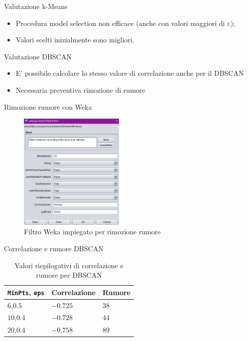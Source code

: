 \documentclass{beamer}
\begin{document}
\begin{frame}{Valutazione k-Means} 
    \begin{itemize}
      \item Procedura model selection non efficace (anche con valori maggiori di $\varepsilon$);
      \item Valori scelti inizialmente sono migliori.
    \end{itemize} 
\end{frame}

\begin{frame}{Valutazione DBSCAN} 
  \begin{itemize}
    \item E' possibile calcolare lo stesso valore di correlazione anche per il DBSCAN
    \item Necessaria preventiva rimozione di rumore
  \end{itemize} 
\end{frame}

\begin{frame}{Rimozione rumore con Weka}
  \begin{figure}[bt]
    \begin{center}
    \includegraphics[width = 0.45\textwidth]{../img/filter-for-remove-noise.pdf}
    \caption{Filtro Weka impiegato per rimozione rumore}
    \end{center}
  \end{figure}
\end{frame}

\begin{frame}{Correlazione e rumore DBSCAN}
\begin{table}[H]
\centering
\begin{tabular}{@{}lll@{}}
\toprule	
\texttt{MinPts}, \texttt{eps} & Correlazione & Rumore \\ \hline
$6$,$0.5$       & $-0.725$  & $38$     \\ 
$10$,$0.4$      & $-0.728$  & $44$     \\ 
$20$,$0.4$      & $-0.758$  & $89$     \\ \bottomrule
\end{tabular}
\caption{Valori riepilogativi di correlazione e rumore per DBSCAN}
\label{tab:corr-noise-dbscan}
\end{table}  
\end{frame}
\end{document}
